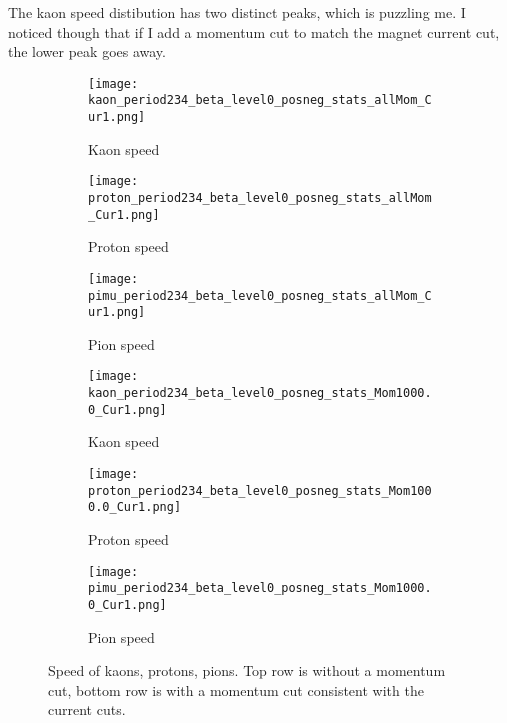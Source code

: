   
  
  
  
  The kaon speed distibution has two distinct peaks, which is puzzling me.  I noticed though that if I add a momentum cut to match the magnet current cut, the lower peak goes away.
  
     \begin{figure}[h]	
 \centering   
               \begin{subfigure}[b]{0.3\textwidth}
            \centering
            \texttt{[image: kaon\_period234\_beta\_level0\_posneg\_stats\_allMom\_Cur1.png]}
            \caption{Kaon speed}
            \end{subfigure}
             \hfill   
            \begin{subfigure}[b]{0.3\textwidth}
            \centering
            \texttt{[image: proton\_period234\_beta\_level0\_posneg\_stats\_allMom\_Cur1.png]}
            \caption{Proton speed}
            \end{subfigure}
             \hfill   
            \begin{subfigure}[b]{0.3\textwidth}
            \centering
            \texttt{[image: pimu\_period234\_beta\_level0\_posneg\_stats\_allMom\_Cur1.png]}
            \caption{Pion speed}
            \end{subfigure}
            
                           \begin{subfigure}[b]{0.3\textwidth}
            \centering
            \texttt{[image: kaon\_period234\_beta\_level0\_posneg\_stats\_Mom1000.0\_Cur1.png]}
            \caption{Kaon speed}
            \end{subfigure}
             \hfill   
            \begin{subfigure}[b]{0.3\textwidth}
            \centering
            \texttt{[image: proton\_period234\_beta\_level0\_posneg\_stats\_Mom1000.0\_Cur1.png]}
            \caption{Proton speed}
            \end{subfigure}
             \hfill   
            \begin{subfigure}[b]{0.3\textwidth}
            \centering
            \texttt{[image: pimu\_period234\_beta\_level0\_posneg\_stats\_Mom1000.0\_Cur1.png]}
            \caption{Pion speed}
            \end{subfigure}
\caption{Speed of kaons, protons, pions. Top row is without a momentum cut, bottom row is with a momentum cut consistent with the current cuts. }

  \end{figure}
  

